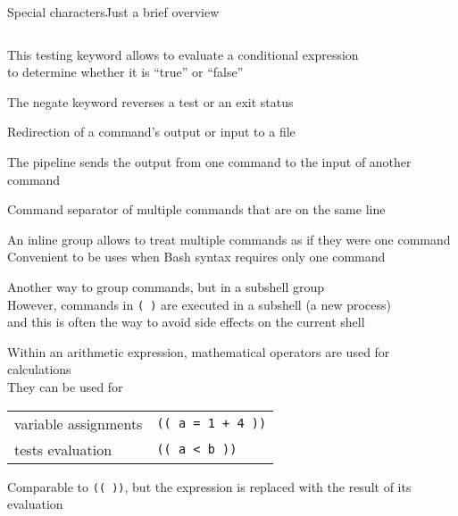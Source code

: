 \begin{frame}[fragile]{Special characters}{Just a brief overview}
\begin{columns}
\begin{column}{\dimexpr\paperwidth-10mm}
\begin{description}[\texttt{>  >>  <}]
                    This \alert{testing keyword} allows to evaluate a conditional expression \\
                    to determine whether it is ``true'' or ``false''
                \item<only@2>[\texttt{!}]
                    The \alert{negate keyword} reverses a test or an exit status
                \item<only@2>[\texttt{>  >>  <}]
                    \alert{Redirection} of a command's output or input to a file
                \item<only@2>[\texttt{|}]
                    The \alert{pipeline} sends the output from one command to the input of another command
                \item<only@2>[\texttt{;}]
                    \alert{Command separator} of multiple commands that are on the same line 
                \item<only@2>[\texttt{\{ \}}]
                    An \alert{inline group} allows to treat multiple commands as if they were one command
                    Convenient to be uses when Bash syntax requires only one command
                \item<only@2>[\texttt{( )}]
                    Another way to group commands, but in a \alert{subshell group} \\
                    However, commands in \texttt{( )} are executed in a subshell (a new process) \\
                    and this is often the way to avoid side effects on the current shell
                \item<only@3-4>[\texttt{(( ))}]
                     Within an \alert{arithmetic expression}, mathematical operators are used for calculations \\
                     They can be used for\\
                     \begin{tabular}{ll}
                        \PB{$\bullet\;$} variable assignments   & \texttt{(( a = 1 + 4 ))}  \\
                        \PB{$\bullet\;$} tests evaluation       & \texttt{(( a < b ))}      \\
                    \end{tabular}
                \item<only@3-4>[\texttt{\$(( ))}]
                    Comparable to \texttt{(( ))}, but the expression is replaced with the result of its evaluation
                \item<only@3-4>[\texttt{*  ?}]

\end{description}
\end{column}
\end{columns}
\end{frame}
